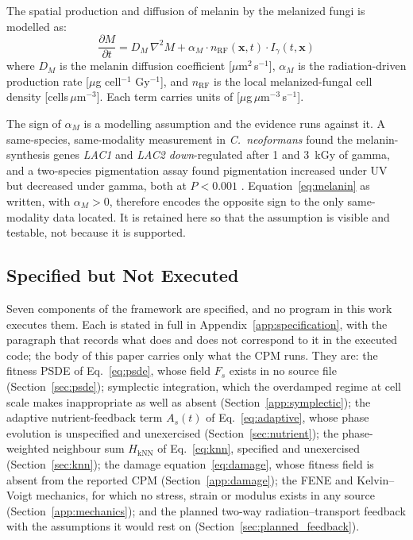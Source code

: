 \documentclass[11pt]{article}
\begin{document}
The spatial production and diffusion of melanin by the melanized fungi is modelled as:
\begin{equation}
\label{eq:melanin}
\frac{\partial M}{\partial t} = D_M\,\nabla^2 M + \alpha_M\cdot n_{\mathrm{RF}}(\mathbf{x},t)\cdot I_\gamma(t,\mathbf{x})
\end{equation}
where $D_M$ is the melanin diffusion coefficient [$\mu$m$^2$\,s$^{-1}$], $\alpha_M$ is the
radiation-driven production rate [$\mu$g cell$^{-1}$ Gy$^{-1}$], and $n_{\mathrm{RF}}$ is the
local melanized-fungal cell density [cells\,$\mu$m$^{-3}$]. Each term carries units of
[$\mu$g\,$\mu$m$^{-3}$\,s$^{-1}$].

The sign of $\alpha_M$ is a modelling assumption and the evidence runs against it. A same-species,
same-modality measurement in \textit{C.\ neoformans} found the melanin-synthesis genes \textit{LAC1}
and \textit{LAC2} \emph{down}-regulated after 1 and 3~kGy of gamma, and a two-species pigmentation
assay found pigmentation increased under UV but decreased under gamma, both at $P < 0.001$
\cite{audit2026}. Equation~\ref{eq:melanin} as written, with $\alpha_M > 0$, therefore encodes the
opposite sign to the only same-modality data located. It is retained here so that the assumption is
visible and testable, not because it is supported.

\subsection{Specified but Not Executed}
\label{sec:specified}

Seven components of the framework are specified, and no program in this work executes them.
Each is stated in full in Appendix~\ref{app:specification}, with the paragraph that records
what does and does not correspond to it in the executed code; the body of this paper carries
only what the CPM runs. They are: the fitness PSDE of Eq.~\ref{eq:psde}, whose field $F_s$
exists in no source file (Section~\ref{sec:psde}); symplectic integration, which the overdamped
regime at cell scale makes inappropriate as well as absent (Section~\ref{app:symplectic}); the
adaptive nutrient-feedback term $A_s(t)$ of Eq.~\ref{eq:adaptive}, whose phase evolution is
unspecified and unexercised (Section~\ref{sec:nutrient}); the phase-weighted neighbour sum $H_{\mathrm{kNN}}$ of
Eq.~\ref{eq:knn}, specified and unexercised (Section~\ref{sec:knn}); the damage
equation~\ref{eq:damage}, whose fitness field is absent from the reported CPM
(Section~\ref{app:damage}); the FENE and Kelvin--Voigt mechanics, for which no stress, strain
or modulus exists in any source (Section~\ref{app:mechanics}); and the planned two-way
radiation--transport feedback with the assumptions it would rest on
(Section~\ref{sec:planned_feedback}).
\end{document}
